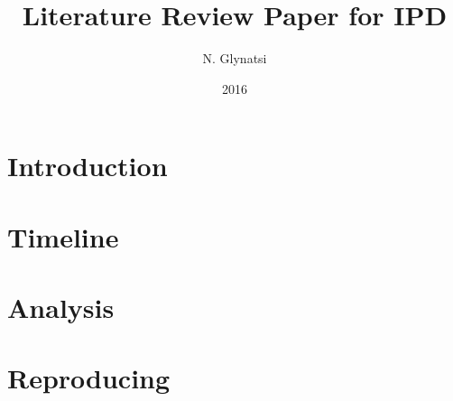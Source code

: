 \documentclass{article}
\title{Literature Review Paper for IPD}
\author{N. Glynatsi}
\date{2016}
\begin{document}
\maketitle

\section{Introduction}

\section{Timeline}

\section{Analysis}

\section{Reproducing}
\end{document}
